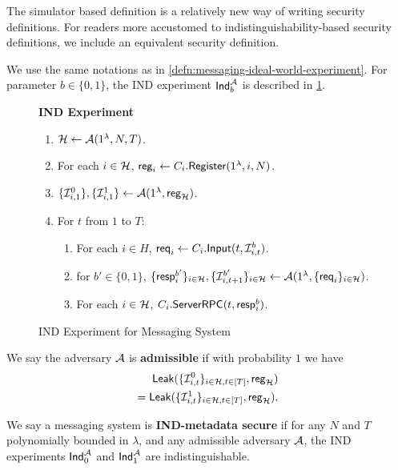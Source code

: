The simulator based definition is a relatively new way of writing security definitions. For readers more accustomed to indistinguishability-based security definitions, we include an equivalent security definition.
\begin{definition}
\label{defn:messaging-ind-experiment}
We use the same notations as in \cref{defn:messaging-ideal-world-experiment}. For parameter $b \in \{0, 1\}$, the IND experiment $\mathsf{Ind}_b^{\mathcal{A}}$ is described in \cref{expr:messaging-IND}.

\begin{figure}[!h]
\begin{framed}
\textbf{IND Experiment}
\begin{enumerate}
\item $\mathcal{H} \leftarrow \mathcal{A}(1^{\lambda}, N, T)$.
\item For each $i \in \mathcal{H}$, $\mathsf{reg}_i \leftarrow C_i.\mathsf{Register}(1^{\lambda}, i, N)$. 
\item $\{\mathcal{I}^{0}_{i, 1}\}, \{\mathcal{I}^{1}_{i, 1}\} \leftarrow \mathcal{A}(1^{\lambda}, \mathsf{reg}_{\mathcal{H}})$.
\item For $t$ from $1$ to $T$:
    \begin{enumerate}
    \item For each $i \in H$, $\mathsf{req}_i \leftarrow C_i.\mathsf{Input}(t, \mathcal{I}^{b}_{i, t})$.
    
    \item for $b'\in \{0, 1\}$, $\{\mathsf{resp}^{b'}_i\}_{i \in \mathcal{H}},\{\mathcal{I}^{b'}_{i, t + 1}\}_{i \in \mathcal{H}} \leftarrow \mathcal{A}(1^{\lambda}, \{\mathsf{req}_i\}_{i \in \mathcal{H}})$.
    
    \item For each $i \in \mathcal{H}$, $C_i.\mathsf{ServerRPC}(t, \mathsf{resp}^{b}_i)$.
    \end{enumerate}
\end{enumerate}
\end{framed}
\caption{IND Experiment for Messaging System}
\label{expr:messaging-IND}
\end{figure}

We say the adversary $\mathcal{A}$ is \textbf{admissible} if with probability $1$ we have
\begin{align*}
\mathsf{Leak}(\{\mathcal{I}^{0}_{i, t}\}_{i \in \mathcal{H}, t \in [T]}, \mathsf{reg}_{\mathcal{H}}) \\
= \mathsf{Leak}(\{\mathcal{I}^{1}_{i, t}\}_{i \in \mathcal{H}, t \in [T]}, \mathsf{reg}_{\mathcal{H}}).    
\end{align*}
\end{definition}
\begin{definition}
\label{defn:messaging-IND-security}
We say a messaging system is \textbf{IND-metadata secure} if for any $N$ and $T$ polynomially bounded in $\lambda$, and any admissible adversary $\mathcal{A}$, the IND experiments $\mathsf{Ind}_0^{\mathcal{A}}$ and $\mathsf{Ind}_1^{\mathcal{A}}$ are indistinguishable.
\end{definition}

